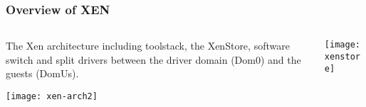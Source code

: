 \begin{frame}[plain]
	\frametitle{Overview of XEN}
	
	
	
	\begin{columns}
		
		\begin{column}{.5\textwidth}
			The Xen architecture including toolstack, the
			XenStore, software switch and split drivers between
			the driver domain (Dom0) and the guests (DomUs).
			
			\centering
			\texttt{[image: xen-arch2]}
			
		\end{column}
		
		\begin{column}{.5\textwidth}
			\centering
			\texttt{[image: xenstore]}
			
			
		\end{column}
		
		
	\end{columns}
	
	
\end{frame}




